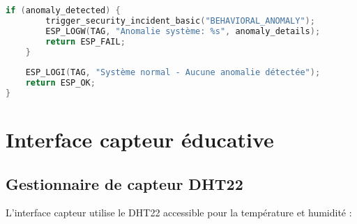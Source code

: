 \begin{lstlisting}[language=C, caption={Détecteur d'anomalies éducatif - anomaly\_detector.c}, label=lst:anomaly-detector]
    if (anomaly_detected) {
        trigger_security_incident_basic("BEHAVIORAL_ANOMALY");
        ESP_LOGW(TAG, "Anomalie système: %s", anomaly_details);
        return ESP_FAIL;
    }
    
    ESP_LOGI(TAG, "Système normal - Aucune anomalie détectée");
    return ESP_OK;
}
\end{lstlisting}

\section{Interface capteur éducative}

\subsection{Gestionnaire de capteur DHT22}

L'interface capteur utilise le DHT22 accessible pour la température et humidité :

